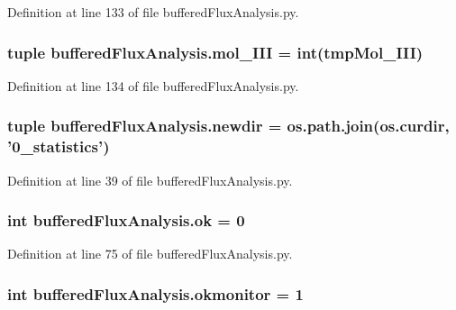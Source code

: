 Definition at line 133 of file buffered\-Flux\-Analysis.\-py.

\hypertarget{namespacebuffered_flux_analysis_adb2a3012a89917afb7db45899a9b3e77}{
\subsubsection[{mol\-\_\-\-I\-I\-I}]{\setlength{\rightskip}{0pt plus 5cm}tuple buffered\-Flux\-Analysis.\-mol\-\_\-\-I\-I\-I = int(tmp\-Mol\-\_\-\-I\-I\-I)}}\label{namespacebuffered_flux_analysis_adb2a3012a89917afb7db45899a9b3e77}


Definition at line 134 of file buffered\-Flux\-Analysis.\-py.

\hypertarget{namespacebuffered_flux_analysis_a90d7a1a691a7ba3f095a06b940e152c9}{
\subsubsection[{newdir}]{\setlength{\rightskip}{0pt plus 5cm}tuple buffered\-Flux\-Analysis.\-newdir = os.\-path.\-join(os.\-curdir, '0\-\_\-statistics')}}\label{namespacebuffered_flux_analysis_a90d7a1a691a7ba3f095a06b940e152c9}


Definition at line 39 of file buffered\-Flux\-Analysis.\-py.

\hypertarget{namespacebuffered_flux_analysis_a2ca9e7b06751f98dec759e29fb4e0ff1}{
\subsubsection[{ok}]{\setlength{\rightskip}{0pt plus 5cm}int buffered\-Flux\-Analysis.\-ok = 0}}\label{namespacebuffered_flux_analysis_a2ca9e7b06751f98dec759e29fb4e0ff1}


Definition at line 75 of file buffered\-Flux\-Analysis.\-py.

\hypertarget{namespacebuffered_flux_analysis_a25fb267e09b519680d3f5d767eaa526c}{
\subsubsection[{okmonitor}]{\setlength{\rightskip}{0pt plus 5cm}int buffered\-Flux\-Analysis.\-okmonitor = 1}}\label{namespacebuffered_flux_analysis_a25fb267e09b519680d3f5d767eaa526c}


